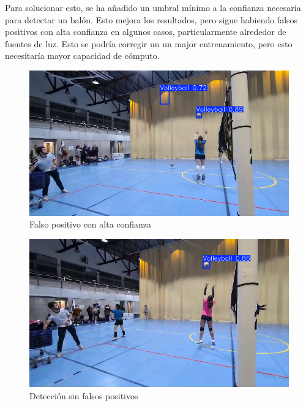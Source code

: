 \documentclass[12pt]{report} %
\begin{document}
    Para solucionar esto, se ha añadido un umbral mínimo a la confianza
    necesaria para detectar un balón. Esto mejora los resultados, pero sigue
    habiendo falsos positivos con alta confianza en algunos casos,
    particularmente alrededor de fuentes de luz. Esto se podría corregir un un
    major entrenamiento, pero esto necesitaría mayor capacidad de cómputo.

    \begin{minipage}{0.45\textwidth}
        \begin{figure}[H]
        \includegraphics[width=\textwidth]{bola2.png}
        \caption{Falso positivo con alta confianza}
        \end{figure}
    \end{minipage}
    \hspace{0.5cm}
    \begin{minipage}{0.45\textwidth}
        \begin{figure}[H]
        \includegraphics[width=\textwidth]{bola3.png}
        \caption{Detección sin falsos positivos}
        \end{figure}
    \end{minipage}
\end{document}
